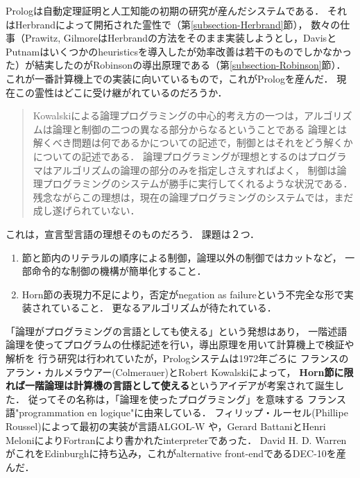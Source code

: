 \documentclass[uplatex, 12pt, dvipdfmx]{jsreport}
\begin{document}
\begin{screen}
Prologは自動定理証明と人工知能の初期の研究が産んだシステムである．
それはHerbrandによって開拓された霊性で（第\ref{subsection-Herbrand}節），
数々の仕事（Prawitz, GilmoreはHerbrandの方法をそのまま実装しようとし，DavisとPutnamはいくつかのheuristicsを導入したが効率改善は若干のものでしかなかった）が結実したのがRobinsonの導出原理である（第\ref{subsection-Robinson}節）．
これが一番計算機上での実装に向いているもので，これがPrologを産んだ．
現在この霊性はどこに受け継がれているのだろうか．
\begin{quote}
    Kowalskiによる論理プログラミングの中心的考え方の一つは，アルゴリズムは論理と制御の二つの異なる部分からなるということである
    論理とは解くべき問題は何であるかについての記述で，制御とはそれをどう解くかについての記述である．
    論理プログラミングが理想とするのはプログラマはアルゴリズムの論理の部分のみを指定しさえすればよく，
    制御は論理プログラミングのシステムが勝手に実行してくれるような状況である．
    残念ながらこの理想は，現在の論理プログラミングのシステムでは，まだ成し遂げられていない\cite{論理プログラミングの基礎}\cite{知識と推論}．
\end{quote}
これは，宣言型言語の理想そのものだろう．
課題は２つ．
\begin{enumerate}
    \item 節と節内のリテラルの順序による制御，論理以外の制御ではカットなど，
    一部命令的な制御の機構が簡単化すること．
    \item Horn節の表現力不足により，否定がnegation as failureという不完全な形で実装されていること．
    更なるアルゴリズムが待たれている．
\end{enumerate}
\end{screen}

\begin{history}[Prolog]
    「論理がプログラミングの言語としても使える」という発想\cite{Kowalski}はあり，
    一階述語論理を使ってプログラムの仕様記述を行い，導出原理を用いて計算機上で検証や解析を
    行う研究は行われていたが，Prologシステムは1972年ごろに
    フランスのアラン・カルメラウアー(Colmerauer)とRobert Kowalskiによって，
    \textbf{Horn節に限れば一階論理は計算機の言語として使える}というアイデアが考案されて誕生した．
    従ってその名称は，「論理を使ったプログラミング」を意味する
    フランス語"programmation en logique"に由来している．
    フィリップ・ルーセル(Phillipe Roussel)によって最初の実装が言語ALGOL-W
    や，Gerard BattaniとHenri MeloniによりFortranにより書かれたinterpreterであった．
    David H. D. WarrenがこれをEdinburghに持ち込み，これがalternative front-endであるDEC-10を産んだ．
\end{history}
\end{document}
